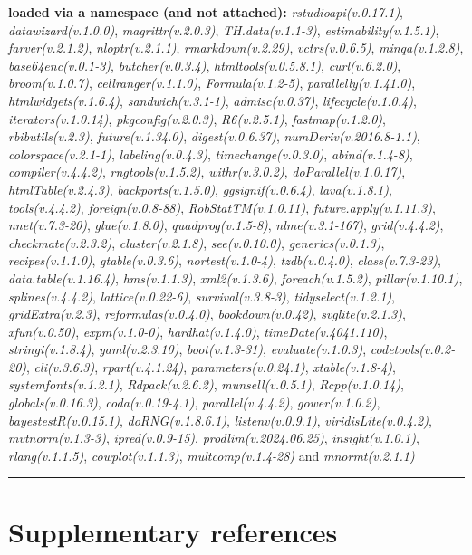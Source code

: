 \documentclass[
  bookmarksnumbered]{article}
\begin{document}
\textbf{loaded via a namespace (and not attached):}
\emph{rstudioapi(v.0.17.1)}, \emph{datawizard(v.1.0.0)}, \emph{magrittr(v.2.0.3)}, \emph{TH.data(v.1.1-3)}, \emph{estimability(v.1.5.1)}, \emph{farver(v.2.1.2)}, \emph{nloptr(v.2.1.1)}, \emph{rmarkdown(v.2.29)}, \emph{vctrs(v.0.6.5)}, \emph{minqa(v.1.2.8)}, \emph{base64enc(v.0.1-3)}, \emph{butcher(v.0.3.4)}, \emph{htmltools(v.0.5.8.1)}, \emph{curl(v.6.2.0)}, \emph{broom(v.1.0.7)}, \emph{cellranger(v.1.1.0)}, \emph{Formula(v.1.2-5)}, \emph{parallelly(v.1.41.0)}, \emph{htmlwidgets(v.1.6.4)}, \emph{sandwich(v.3.1-1)}, \emph{admisc(v.0.37)}, \emph{lifecycle(v.1.0.4)}, \emph{iterators(v.1.0.14)}, \emph{pkgconfig(v.2.0.3)}, \emph{R6(v.2.5.1)}, \emph{fastmap(v.1.2.0)}, \emph{rbibutils(v.2.3)}, \emph{future(v.1.34.0)}, \emph{digest(v.0.6.37)}, \emph{numDeriv(v.2016.8-1.1)}, \emph{colorspace(v.2.1-1)}, \emph{labeling(v.0.4.3)}, \emph{timechange(v.0.3.0)}, \emph{abind(v.1.4-8)}, \emph{compiler(v.4.4.2)}, \emph{rngtools(v.1.5.2)}, \emph{withr(v.3.0.2)}, \emph{doParallel(v.1.0.17)}, \emph{htmlTable(v.2.4.3)}, \emph{backports(v.1.5.0)}, \emph{ggsignif(v.0.6.4)}, \emph{lava(v.1.8.1)}, \emph{tools(v.4.4.2)}, \emph{foreign(v.0.8-88)}, \emph{RobStatTM(v.1.0.11)}, \emph{future.apply(v.1.11.3)}, \emph{nnet(v.7.3-20)}, \emph{glue(v.1.8.0)}, \emph{quadprog(v.1.5-8)}, \emph{nlme(v.3.1-167)}, \emph{grid(v.4.4.2)}, \emph{checkmate(v.2.3.2)}, \emph{cluster(v.2.1.8)}, \emph{see(v.0.10.0)}, \emph{generics(v.0.1.3)}, \emph{recipes(v.1.1.0)}, \emph{gtable(v.0.3.6)}, \emph{nortest(v.1.0-4)}, \emph{tzdb(v.0.4.0)}, \emph{class(v.7.3-23)}, \emph{data.table(v.1.16.4)}, \emph{hms(v.1.1.3)}, \emph{xml2(v.1.3.6)}, \emph{foreach(v.1.5.2)}, \emph{pillar(v.1.10.1)}, \emph{splines(v.4.4.2)}, \emph{lattice(v.0.22-6)}, \emph{survival(v.3.8-3)}, \emph{tidyselect(v.1.2.1)}, \emph{gridExtra(v.2.3)}, \emph{reformulas(v.0.4.0)}, \emph{bookdown(v.0.42)}, \emph{svglite(v.2.1.3)}, \emph{xfun(v.0.50)}, \emph{expm(v.1.0-0)}, \emph{hardhat(v.1.4.0)}, \emph{timeDate(v.4041.110)}, \emph{stringi(v.1.8.4)}, \emph{yaml(v.2.3.10)}, \emph{boot(v.1.3-31)}, \emph{evaluate(v.1.0.3)}, \emph{codetools(v.0.2-20)}, \emph{cli(v.3.6.3)}, \emph{rpart(v.4.1.24)}, \emph{parameters(v.0.24.1)}, \emph{xtable(v.1.8-4)}, \emph{systemfonts(v.1.2.1)}, \emph{Rdpack(v.2.6.2)}, \emph{munsell(v.0.5.1)}, \emph{Rcpp(v.1.0.14)}, \emph{globals(v.0.16.3)}, \emph{coda(v.0.19-4.1)}, \emph{parallel(v.4.4.2)}, \emph{gower(v.1.0.2)}, \emph{bayestestR(v.0.15.1)}, \emph{doRNG(v.1.8.6.1)}, \emph{listenv(v.0.9.1)}, \emph{viridisLite(v.0.4.2)}, \emph{mvtnorm(v.1.3-3)}, \emph{ipred(v.0.9-15)}, \emph{prodlim(v.2024.06.25)}, \emph{insight(v.1.0.1)}, \emph{rlang(v.1.1.5)}, \emph{cowplot(v.1.1.3)}, \emph{multcomp(v.1.4-28)} and \emph{mnormt(v.2.1.1)}

\begin{center}\rule{0.5\linewidth}{0.5pt}\end{center}

\section{Supplementary references}\label{refs}

\begin{multicols}{2}
\AtNextBibliography{\footnotesize}
\printbibliography[heading=none]
\normalsize
\end{multicols}

\def\printbibliography{}

\printbibliography
\end{document}
